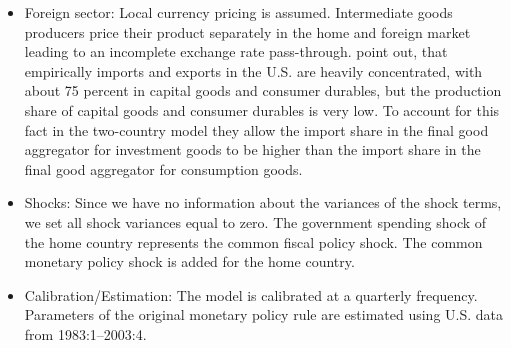 \documentclass[11pt,a4paper]{article}
\begin{document}
\begin{itemize}
		\item Foreign sector: Local currency pricing is assumed. Intermediate goods producers price their product separately in the home and foreign market leading to an incomplete exchange rate pass-through. \cite{ErcegGuerrieriGust2008} point out, that empirically imports and exports in the U.S. are heavily concentrated, with about 75 percent in capital goods and consumer durables, but the production share of capital goods and consumer durables is very low. To account for this fact in the two-country model they allow the import share in the final good aggregator for investment goods to be higher than the import share in the final good aggregator for consumption goods.
		\item Shocks: Since we have no information about the variances of the shock terms, we set all shock variances equal to zero. The government spending shock of the home country represents the common fiscal policy shock. The common monetary policy shock is added for the home country.
		\item Calibration/Estimation: The model is calibrated at a quarterly frequency. Parameters of the original monetary policy rule are estimated using U.S. data from 1983:1--2003:4.
		
		
	\end{itemize}
	
\end{document}
